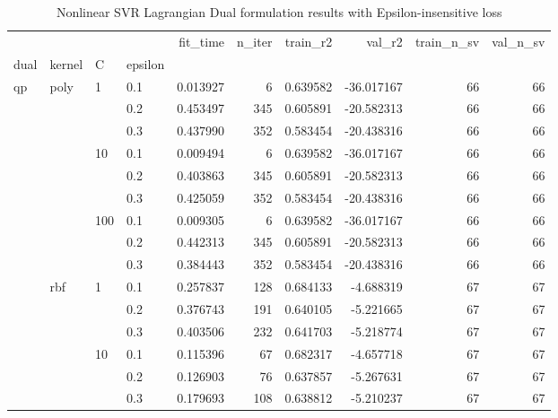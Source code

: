 \begin{table}[H]
\centering
\caption{Nonlinear SVR Lagrangian Dual formulation results with Epsilon-insensitive loss}
\label{nonlinear_lagrangian_dual_svr_cv_results}
\begin{tabular}{llllrrrrrr}
\toprule
     &     &     &     &  fit\_time &  n\_iter &  train\_r2 &     val\_r2 &  train\_n\_sv &  val\_n\_sv \\
dual & kernel & C & epsilon &           &         &           &            &             &           \\
\midrule
qp & poly & 1   & 0.1 &  0.013927 &       6 &  0.639582 & -36.017167 &          66 &        66 \\
     &     &     & 0.2 &  0.453497 &     345 &  0.605891 & -20.582313 &          66 &        66 \\
     &     &     & 0.3 &  0.437990 &     352 &  0.583454 & -20.438316 &          66 &        66 \\
     &     & 10  & 0.1 &  0.009494 &       6 &  0.639582 & -36.017167 &          66 &        66 \\
     &     &     & 0.2 &  0.403863 &     345 &  0.605891 & -20.582313 &          66 &        66 \\
     &     &     & 0.3 &  0.425059 &     352 &  0.583454 & -20.438316 &          66 &        66 \\
     &     & 100 & 0.1 &  0.009305 &       6 &  0.639582 & -36.017167 &          66 &        66 \\
     &     &     & 0.2 &  0.442313 &     345 &  0.605891 & -20.582313 &          66 &        66 \\
     &     &     & 0.3 &  0.384443 &     352 &  0.583454 & -20.438316 &          66 &        66 \\
     & rbf & 1   & 0.1 &  0.257837 &     128 &  0.684133 &  -4.688319 &          67 &        67 \\
     &     &     & 0.2 &  0.376743 &     191 &  0.640105 &  -5.221665 &          67 &        67 \\
     &     &     & 0.3 &  0.403506 &     232 &  0.641703 &  -5.218774 &          67 &        67 \\
     &     & 10  & 0.1 &  0.115396 &      67 &  0.682317 &  -4.657718 &          67 &        67 \\
     &     &     & 0.2 &  0.126903 &      76 &  0.637857 &  -5.267631 &          67 &        67 \\
     &     &     & 0.3 &  0.179693 &     108 &  0.638812 &  -5.210237 &          67 &        67 \\

\end{tabular}
\end{table}
